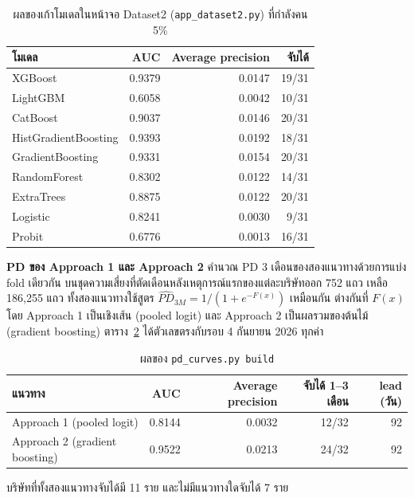 \documentclass[12pt]{article}
\begin{document}
\begin{table}[H]
\centering
\small
\caption{ผลของเก้าโมเดลในหน้าจอ Dataset2 (\texttt{app\_dataset2.py}) ที่กำลังคน 5\%}
\label{tab:appd2}
\begin{tabular}{@{}lrrr@{}}
\toprule
\textbf{โมเดล} & \textbf{AUC} & \textbf{Average precision} & \textbf{จับได้} \\
\midrule
XGBoost & 0.9379 & 0.0147 & 19/31 \\
LightGBM & 0.6058 & 0.0042 & 10/31 \\
CatBoost & 0.9037 & 0.0146 & 20/31 \\
HistGradientBoosting & 0.9393 & 0.0192 & 18/31 \\
GradientBoosting & 0.9331 & 0.0154 & 20/31 \\
RandomForest & 0.8302 & 0.0122 & 14/31 \\
ExtraTrees & 0.8875 & 0.0122 & 20/31 \\
Logistic & 0.8241 & 0.0030 & 9/31 \\
Probit & 0.6776 & 0.0013 & 16/31 \\
\bottomrule
\end{tabular}
\end{table}

\textbf{PD ของ Approach 1 และ Approach 2}  คำนวณ PD 3 เดือนของสองแนวทางด้วยการแบ่ง fold เดียวกัน บนชุดความเสี่ยงที่ตัดเดือนหลังเหตุการณ์แรกของแต่ละบริษัทออก 752 แถว เหลือ 186,255 แถว ทั้งสองแนวทางใช้สูตร $\widehat{PD}_{3M}=1/(1+e^{-F(x)})$ เหมือนกัน ต่างกันที่ $F(x)$ โดย Approach 1 เป็นเชิงเส้น (pooled logit) และ Approach 2 เป็นผลรวมของต้นไม้ (gradient boosting) ตาราง~\ref{tab:pdcurves} ได้ตัวเลขตรงกับรอบ 4 กันยายน 2026 ทุกค่า

\begin{table}[H]
\centering
\small
\caption{ผลของ \texttt{pd\_curves.py build}}
\label{tab:pdcurves}
\begin{tabular}{@{}lrrrr@{}}
\toprule
\textbf{แนวทาง} & \textbf{AUC} & \textbf{Average precision} & \textbf{จับได้ 1--3 เดือน} & \textbf{lead (วัน)} \\
\midrule
Approach 1 (pooled logit) & 0.8144 & 0.0032 & 12/32 & 92 \\
Approach 2 (gradient boosting) & 0.9522 & 0.0213 & 24/32 & 92 \\
\bottomrule
\end{tabular}
\end{table}

\noindent บริษัทที่ทั้งสองแนวทางจับได้มี 11 ราย และไม่มีแนวทางใดจับได้ 7 ราย
\end{document}
